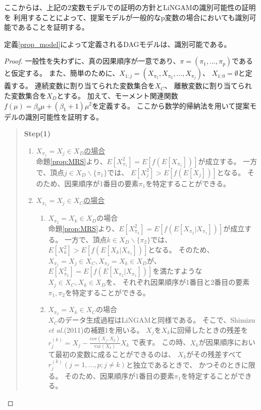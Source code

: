 ここからは、上記の2変数モデルでの証明の方針とLiNGAMの識別可能性の証明\cite{Shimizu2011-pd}を
利用することによって、提案モデルが一般的なp変数の場合においても識別可能であることを証明する。

\begin{theo}[提案モデルの識別可能性]
  定義\ref{prop_model}によって定義されるDAGモデルは、識別可能である。
\end{theo}

\begin{proof}
  一般性を失わずに、真の因果順序が一意であり、$\pi = (\pi_1, \dots, \pi_p)$であると仮定する。
  また、簡単のために、$X_{1:j} = (X_{\pi_1}, X_{\pi_2}, \dots, X_{\pi_j})$、
  $X_{1:0} = \emptyset$と定義する。
  連続変数に割り当てられた変数集合を$X_C$、
  離散変数に割り当てられた変数集合を$X_D$とする。
  加えて、モーメント関連関数$f(\mu) = \beta_0 \mu + (\beta_1 + 1)\mu^2$を定義する。
  ここから数学的帰納法を用いて提案モデルの識別可能性を証明する。

  \begin{quote}
    \textbf{Step(1)}
    \begin{enumerate}[label=(\roman*)]
      \item
      \underline{$X_{\pi_1} = X_j \in X_D$の場合} \\
      命題\ref{prop:MRS}より、$E[X_{\pi_1}^2] = E[f(E[X_{\pi_1}])]$が成立する。
      一方で、頂点$j \in X_D \backslash \{\pi_1\}$では、
      $E[X_j^2] > E[f(E[X_j])]$となる。
      そのため、因果順序が1番目の要素$\pi_1$を特定することができる。

      \item
      \underline{$X_{\pi_1} = X_j \in X_C$の場合}
      \begin{enumerate}[label=(ii - \alph*)]
        \item
        $X_{\pi_2} = X_k \in X_D$の場合 \\
        命題\ref{prop:MRS}より、$E[X_{\pi_2}^2] = E[f(E[X_{\pi_2} | X_{\pi_1}])]$が成立する。
        一方で、頂点$k \in X_D \backslash \{\pi_2\}$では、
        $E[X_k^2] > E[f(E[X_k | X_{\pi_1}])]$となる。
        そのため、$X_{\pi_1} = X_j \in X_C, X_{\pi_2} = X_k \in X_D$が、
        $E[X_{\pi_2}^2] = E[f(E[X_{\pi_2} | X_{\pi_1}])]$を満たすような
        $X_j \in X_C, X_k \in X_D$を、
        それぞれ因果順序が1番目と2番目の要素$\pi_1, \pi_2$を特定することができる。

        \item
        $X_{\pi_2} = X_k \in X_C$の場合 \\
        $X_C$のデータ生成過程はLiNGAM\cite{Shimizu2006-yu}と同様である。
        そこで、Shimizu \textit{et al.}(2011)\cite{Shimizu2011-pd}の補題1を用いる。
        $X_j$を$X_k$に回帰したときの残差を
        $r_j^{(k)} = X_j - \frac{\text{cov}(X_j, X_k)}{\text{var}(X_k)} X_k$
        で表す。
        この時、$X_k$が因果順序において最初の変数に成ることができるのは、
        $X_k$がその残差すべて$r_j^{(k)} (j = 1,\dots,p; j \neq k)$と独立であるときで、
        かつそのときに限る。
        そのため、因果順序が1番目の要素$\pi_1$を特定することができる。


\end{enumerate}
\end{enumerate}
\end{quote}
\end{proof}
